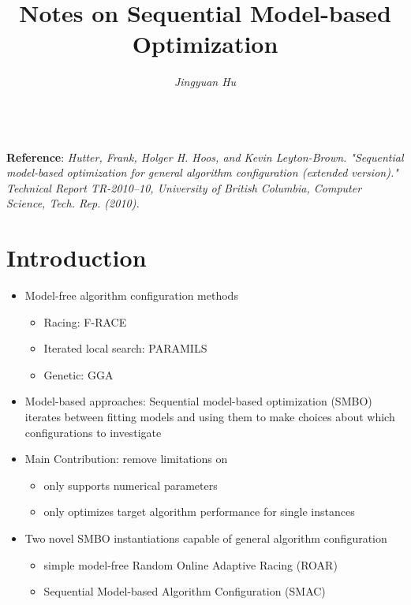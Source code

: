 \documentclass[10pt]{article}
\theoremstyle{definition}
\begin{document}
\title{\vspace{-1.6cm} \huge\textbf{{Notes on Sequential Model-based Optimization}}}
\author{\large\textit{{Jingyuan Hu}}}
\date{}
\maketitle
\text{}\\
{\bf Reference}: {\it Hutter, Frank, Holger H. Hoos, and Kevin Leyton-Brown.
"Sequential model-based optimization for general algorithm configuration (extended version)."
Technical Report TR-2010–10, University of British Columbia, Computer Science, Tech. Rep. (2010).}

\tableofcontents

\section{Introduction}

\begin{itemize}
	\item Model-free algorithm configuration methods
	      \begin{itemize}
		      \item Racing: F-RACE
		      \item Iterated local search: PARAMILS
		      \item Genetic: GGA
	      \end{itemize}
	\item Model-based approaches: Sequential model-based optimization (SMBO)
	      iterates between fitting models and using them to make choices about which configurations to investigate
	\item Main Contribution: remove limitations on
	      \begin{itemize}
		      \item only supports numerical parameters
		      \item only optimizes target algorithm performance for single instances
	      \end{itemize}
	\item Two novel SMBO instantiations capable of general algorithm configuration
	      \begin{itemize}
		      \item simple model-free Random Online Adaptive Racing (ROAR)
		      \item Sequential Model-based Algorithm Configuration (SMAC)
	      \end{itemize}
\end{itemize}
\end{document}
